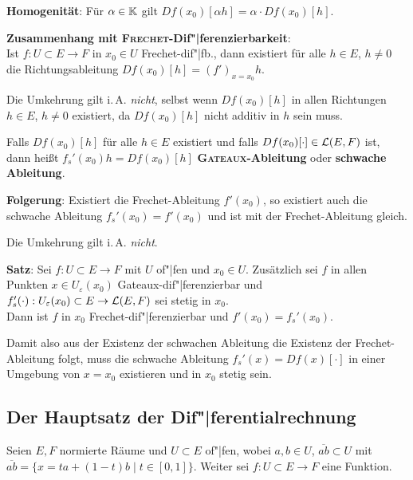 \linie

\textbf{Homogenität}:
Für $\alpha \in \mathbb{K}$ gilt $Df(x_0)[\alpha h] = \alpha \cdot Df(x_0)[h]$.

\textbf{Zusammenhang mit \textsc{Frechet}-Dif"|ferenzierbarkeit}: \\
Ist $f: U \subset E \rightarrow F$ in $x_0 \in U$ Frechet-dif"|fb.,
dann existiert für alle $h \in E$, $h \not= 0$ die Richtungsableitung
$Df(x_0)[h] = (f')_{x=x_0}h$.

Die Umkehrung gilt i.\,A. \emph{nicht}, selbst wenn $Df(x_0)[h]$ in allen
Richtungen $h \in E$, $h \not= 0$ existiert,
da $Df(x_0)[h]$ nicht additiv in $h$ sein muss.

\linie

Falls $Df(x_0)[h]$ für alle $h \in E$ existiert und falls
$Df(x_0)[\cdot] \in \mathcal{L}(E,F)$ ist, \\
dann heißt $f_s'(x_0)h = Df(x_0)[h]$
\textbf{\textsc{Gateaux}-Ableitung} oder \textbf{schwache Ableitung}.

\textbf{Folgerung}:
Existiert die Frechet-Ableitung $f'(x_0)$, so existiert auch
die schwache Ableitung $f_s'(x_0) = f'(x_0)$ und ist mit der
Frechet-Ableitung gleich.

Die Umkehrung gilt i.\,A. \emph{nicht}.

\linie

\textbf{Satz}:
Sei $f: U \subset E \rightarrow F$ mit $U$ of"|fen und $x_0 \in U$.
Zusätzlich sei $f$ in allen Punkten $x \in U_\varepsilon(x_0)$
Gateaux-dif"|ferenzierbar und
$f_s'(\cdot): U_\varepsilon(x_0) \subset E \rightarrow \mathcal{L}(E,F)$ sei
stetig in $x_0$. \\
Dann ist $f$ in $x_0$ Frechet-dif"|ferenzierbar und $f'(x_0) = f_s'(x_0)$.

Damit also aus der Existenz der schwachen Ableitung die Existenz der
Frechet-Ableitung folgt, muss die schwache Ableitung
$f_s'(x) = Df(x)[\cdot]$ in einer Umgebung von $x = x_0$ existieren
und in $x_0$ stetig sein.

\subsection{%
    Der Hauptsatz der Dif"|ferentialrechnung%
}

Seien $E, F$ normierte Räume und $U \subset E$ of"|fen, wobei
$a, b \in U$, $\overline{ab} \subset U$ mit \\
$\overline{ab} = \{x = ta + (1 - t)b \;|\; t \in [0,1]\}$.
Weiter sei $f: U \subset E \rightarrow F$ eine Funktion.

